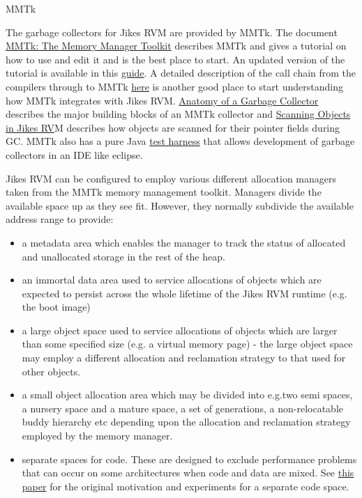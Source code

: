 \begin{chapter}{MMTk}
\label{cha:mmtk}

The garbage collectors for Jikes RVM are provided by MMTk. The document \href{http://cs.anu.edu.au/~Robin.Garner/mmtk-guide.pdf}{MMTk: The Memory Manager Toolkit} describes MMTk and gives a tutorial on how to use and edit it and is the best place to start.  An updated version of the tutorial is available in this \hyperref[part:mmtktutorial]{guide}. A detailed description of the call chain from the compilers through to MMTk \hyperref[sec:memoryallocationinjikesrvm]{here} is another good place to start understanding how MMTk integrates with Jikes RVM.  \hyperref[sec:anatomyofagarbagecollector]{Anatomy of a Garbage Collector} describes the major building blocks of an MMTk collector and \hyperref[sec:scanningobjectsinjikesrvm]{Scanning Objects in Jikes RV}M describes how objects are scanned for their pointer fields during GC.  MMTk also has a pure Java \hyperref[cha:themmtktestharness]{test harness} that allows development of garbage collectors in an IDE like eclipse.

Jikes RVM can be configured to employ various different allocation managers taken from the MMTk memory management toolkit. Managers divide the available space up as they see fit. However, they normally subdivide the available address range to provide:
\begin{itemize}
  \item a metadata area which enables the manager to track the status of allocated and unallocated storage in the rest of the heap.
  \item an immortal data area used to service allocations of objects which are expected to persist across the whole lifetime of the Jikes RVM runtime (e.g. the boot image)
  \item a large object space used to service allocations of objects which are larger than some specified size (e.g. a virtual memory page) - the large object space may employ a different allocation and reclamation strategy to that used for other objects.
  \item a small object allocation area which may be divided into e.g.two semi spaces, a nursery space and a mature space, a set of generations, a non-relocatable buddy hierarchy etc depending upon the allocation and reclamation strategy employed by the memory manager.
  \item separate spaces for code. These are designed to exclude performance problems that can occur on some architectures when code and data are mixed. See \href{http://dl.acm.org/citation.cfm?doid=1133956.1133980}{this paper} for the original motivation and experiments for a separate code space.
\end{itemize}


\end{chapter}
